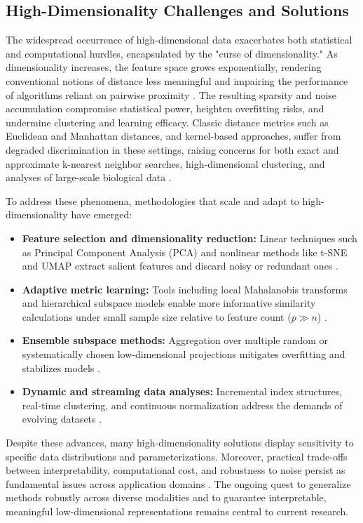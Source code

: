 \documentclass[sigconf]{acmart}
\begin{document}
\subsection{High-Dimensionality Challenges and Solutions}

The widespread occurrence of high-dimensional data exacerbates both statistical and computational hurdles, encapsulated by the "curse of dimensionality." As dimensionality increases, the feature space grows exponentially, rendering conventional notions of distance less meaningful and impairing the performance of algorithms reliant on pairwise proximity \cite{ref64,ref65}. The resulting sparsity and noise accumulation compromise statistical power, heighten overfitting risks, and undermine clustering and learning efficacy. Classic distance metrics such as Euclidean and Manhattan distances, and kernel-based approaches, suffer from degraded discrimination in these settings, raising concerns for both exact and approximate k-nearest neighbor searches, high-dimensional clustering, and analyses of large-scale biological data \cite{ref72,ref73,ref93,ref110,ref116}.

To address these phenomena, methodologies that scale and adapt to high-dimensionality have emerged:

\begin{itemize}
    \item \textbf{Feature selection and dimensionality reduction:} Linear techniques such as Principal Component Analysis (PCA) and nonlinear methods like t-SNE and UMAP extract salient features and discard noisy or redundant ones \cite{ref92,ref97,ref101}.
    \item \textbf{Adaptive metric learning:} Tools including local Mahalanobis transforms and hierarchical subspace models enable more informative similarity calculations under small sample size relative to feature count (\(p \gg n\)) \cite{ref64,ref92,ref93}.
    \item \textbf{Ensemble subspace methods:} Aggregation over multiple random or systematically chosen low-dimensional projections mitigates overfitting and stabilizes models \cite{ref116}.
    \item \textbf{Dynamic and streaming data analyses:} Incremental index structures, real-time clustering, and continuous normalization address the demands of evolving datasets \cite{ref76,ref79,ref80,ref94}.
\end{itemize}

Despite these advances, many high-dimensionality solutions display sensitivity to specific data distributions and parameterizations. Moreover, practical trade-offs between interpretability, computational cost, and robustness to noise persist as fundamental issues across application domains \cite{ref91,ref94,ref95}. The ongoing quest to generalize methods robustly across diverse modalities and to guarantee interpretable, meaningful low-dimensional representations remains central to current research.
\end{document}
